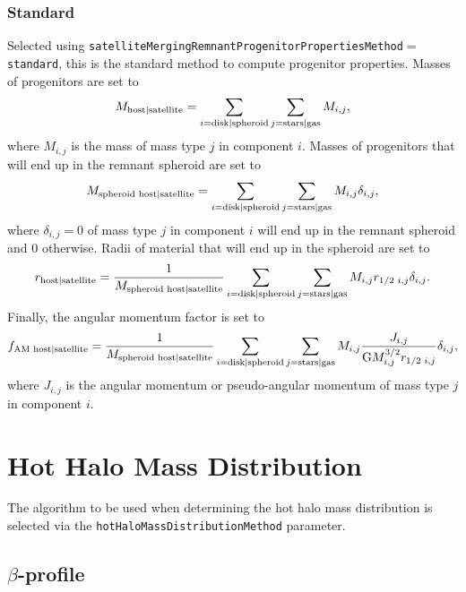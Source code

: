 \subsubsection{Standard}

Selected using {\tt satelliteMergingRemnantProgenitorPropertiesMethod}$=${\tt standard}, this is the standard method to compute progenitor properties. Masses of progenitors are set to
\begin{equation}
 M_{\rm host|satellite} = \sum_{i={\rm disk|spheroid}} \sum_{j={\rm stars|gas}} M_{i,j},
\end{equation}
where $M_{i,j}$ is the mass of mass type $j$ in \gls{component} $i$. Masses of progenitors that will end up in the remnant spheroid are set to
\begin{equation}
 M_{\rm spheroid\,\,host|satellite} = \sum_{i={\rm disk|spheroid}} \sum_{j={\rm stars|gas}} M_{i,j} \delta_{i,j},
\end{equation}
where $\delta_{i,j}=0$ of mass type $j$ in \gls{component} $i$ will end up in the remnant spheroid and $0$ otherwise. Radii of material that will end up in the spheroid are set to
\begin{equation}
 r_{\rm host|satellite} = {1 \over M_{\rm spheroid\,\,host|satellite}} \sum_{i={\rm disk|spheroid}} \sum_{j={\rm stars|gas}} M_{i,j} r_{1/2\,\,i,j} \delta_{i,j}.
\end{equation}
Finally, the angular momentum factor is set to
\begin{equation}
 f_{\rm AM\,\,host|satellite} = {1 \over M_{\rm spheroid\,\,host|satellite}} \sum_{i={\rm disk|spheroid}} \sum_{j={\rm stars|gas}} M_{i,j} {J_{i,j} \over {\rm G} M^{3/2}_{i,j} r_{1/2\,\,i,j}} \delta_{i,j},
\end{equation}
where $J_{i,j}$ is the angular momentum or pseudo-angular momentum of mass type $j$ in \gls{component} $i$.

\section{Hot Halo Mass Distribution}

The algorithm to be used when determining the hot halo mass distribution is selected via the {\tt hotHaloMassDistributionMethod} parameter.

\subsection{$\beta$-profile}\label{phys:hotHaloMassDistribution:hotHaloMassDistributionBetaProfile}

